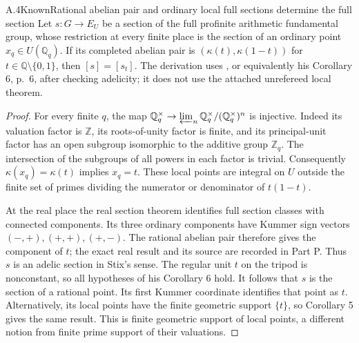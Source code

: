 \begin{result}{A.4}{Known}{Rational abelian pair and ordinary local full sections determine the full section}
Let \(s:G\to E_U\) be a section of the full profinite arithmetic
fundamental group, whose restriction at every finite place is the section
of an ordinary point \(x_q\in U(\mathbb Q_q)\). If its completed
abelian pair is \((\kappa(t),\kappa(1-t))\) for
\(t\in\mathbb Q\setminus\{0,1\}\), then \([s]=[s_t]\).
The derivation uses \citet[Corollary 5, p.~5]{Stix2015}, or equivalently
his Corollary 6, p.~6, after checking adelicity; it does not use the
attached unrefereed local theorem.
\end{result}
\begin{proof}
For every finite \(q\), the map
\(\mathbb Q_q^\times\to\varprojlim_n
\mathbb Q_q^\times/(\mathbb Q_q^\times)^n\) is injective.
Indeed its valuation factor is \(\mathbb Z\), its roots-of-unity
factor is finite, and its principal-unit factor has an open subgroup
isomorphic to the additive group \(\mathbb Z_q\). The intersection
of the subgroups of all powers in each factor is trivial. Consequently
\(\kappa(x_q)=\kappa(t)\) implies \(x_q=t\).
These local points are integral on \(U\) outside the finite set of
primes dividing the numerator or denominator of \(t(1-t)\).

At the real place the real section theorem identifies full section
classes with connected components. Its three ordinary components have
Kummer sign vectors \((- ,+),(+,+),(+,-)\). The rational abelian pair
therefore gives the component of \(t\); the exact real result and its
source are recorded in Part P. Thus \(s\) is an adelic section in
Stix's sense. The regular unit \(t\) on the tripod is nonconstant,
so all hypotheses of his Corollary 6 hold. It follows that \(s\) is
the section of a rational point. Its first Kummer coordinate identifies
that point as \(t\). Alternatively, its local points have the finite
geometric support \(\{t\}\), so Corollary 5 gives the same result.
This is finite geometric support of local points, a different notion
from finite prime support of their valuations.
\end{proof}

